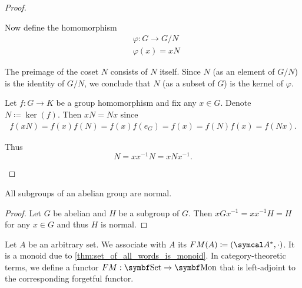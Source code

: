 \begin{proof}
\begin{description}
    Now define the homomorphism
    \begin{align*}
      &\varphi: G \to G / N \\
      &\varphi(x) = xN
    \end{align*}

    The preimage of the coset \( N \) consists of \( N \) itself. Since \( N \) (as an element of \( G / N \)) is the identity of \( G / N \), we conclude that \( N \) (as a subset of \( G \)) is the kernel of \( \varphi \).

     Let \( f: G \to K \) be a group homomorphism and fix any \( x \in G \). Denote \( N \coloneqq \ker(f) \). Then \( xN = Nx \) since
    \begin{align*}
      f(xN)
      =
      f(x) f(N)
      =
      f(x) f(e_G)
      =
      f(x)
      =
      f(N) f(x)
      =
      f(Nx).
    \end{align*}

    Thus
    \begin{equation*}
      N = xx^{-1}N = xNx^{-1}.
    \end{equation*}
  \end{description}
\end{proof}

\begin{proposition}\label{thm:abelian_normal_subgroups}
  All subgroups of an abelian group are normal.
\end{proposition}
\begin{proof}
  Let \( G \) be abelian and \( H \) be a subgroup of \( G \). Then \( xGx^{-1} = xx^{-1}H = H \) for any \( x \in G \) and thus \( H \) is normal.
\end{proof}

\begin{definition}\label{def:free_monoid}\cite[306]{Knapp2016BAlg}
  Let \( A \) be an arbitrary set. We associate with \( A \) its  \( FM(A) \coloneqq (\Cal{A}^{*}, \cdot) \). It is a monoid due to \cref{thm:set_of_all_words_is_monoid}. In category-theoretic terms, we define a functor \( FM: \Cat{Set} \to \Cat{Mon} \) that is left-adjoint to the corresponding forgetful functor.
\end{definition}

